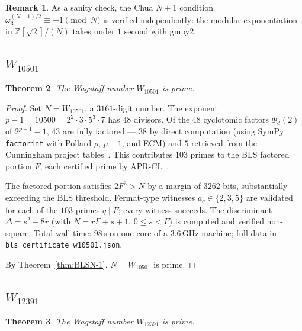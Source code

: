 \documentclass[11pt,a4paper]{amsart}
\theoremstyle{plain}
\newtheorem{theorem}{Theorem}[section]
\theoremstyle{definition}
\newtheorem{remark}[theorem]{Remark}
\newcommand{\Z}{\mathbb{Z}}
\newcommand{\wom}{\omega_3}
\newcommand{\sqrttwo}{\sqrt{2}}
\begin{document}
\begin{remark}
As a sanity check, the Chua $N + 1$ condition $\wom^{(N+1)/2} \equiv
-1 \pmod N$ is verified independently: the modular exponentiation in
$\Z[\sqrttwo]/(N)$ takes under $1$ second with gmpy2.
\end{remark}

\subsection{$W_{10501}$}
\label{ssec:w10501}

\begin{theorem}
\label{thm:w10501}
The Wagstaff number $W_{10501}$ is prime.
\end{theorem}

\begin{proof}
Set $N = W_{10501}$, a $3161$-digit number. The exponent $p - 1 =
10500 = 2^2 \cdot 3 \cdot 5^3 \cdot 7$ has $48$ divisors. Of the $48$
cyclotomic factors $\Phi_d(2)$ of $2^{p-1} - 1$, $43$ are fully
factored --- $38$ by direct computation (using SymPy
\texttt{factorint} with Pollard $\rho$, $p - 1$, and ECM) and $5$
retrieved from the Cunningham project tables~\cite{Cunningham}. This
contributes $103$ primes to the BLS factored portion $F$, each
certified prime by APR-CL~\cite{APR,CohenLenstra}.

The factored portion satisfies $2 F^3 > N$ by a margin of $3262$
bits, substantially exceeding the BLS threshold. Fermat-type
witnesses $a_q \in \{2, 3, 5\}$ are validated for each of the $103$
primes $q \mid F$; every witness succeeds. The discriminant
$\Delta = s^2 - 8r$ (with $N = rF + s + 1$, $0 \leq s < F$) is
computed and verified non-square. Total wall time: $98$\,s on one
core of a 3.6\,GHz machine; full data in
\texttt{bls\_certificate\_w10501.json}.

By Theorem~\ref{thm:BLSN-1}, $N = W_{10501}$ is prime.
\end{proof}

\subsection{$W_{12391}$}
\label{ssec:w12391}

\begin{theorem}
\label{thm:w12391}
The Wagstaff number $W_{12391}$ is prime.
\end{theorem}
\end{document}
